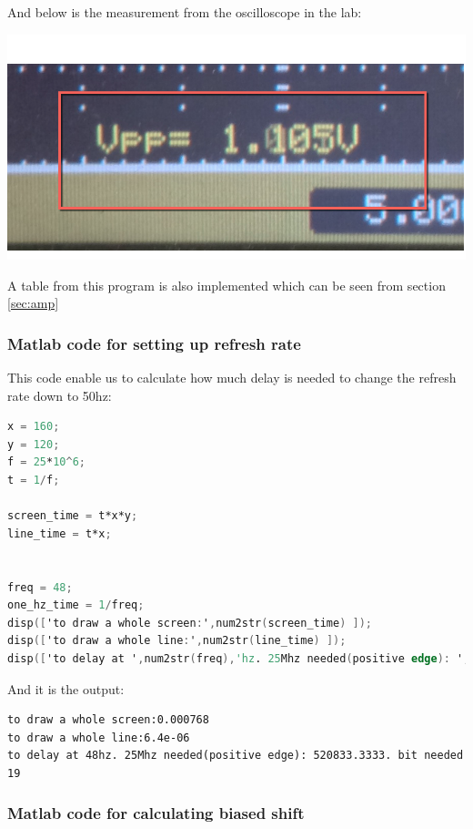 \documentclass[11pt]{scrartcl}
\begin{document}
And below is the measurement from the oscilloscope in the lab:
\begin{center}     
\begin{minipage}[t]{\linewidth}


\includegraphics[scale = 0.4]{vpp.png}
\end{minipage}
\medskip
\end{center}

A table from this program is also implemented which can be seen from section \ref{sec:amp}

\subsubsection{Matlab code for setting up refresh rate}
\label{sec:refresh}
This code enable us to calculate how much delay is needed to change the refresh rate down to 50hz:
\begin{lstlisting}[language=Verilog]
x = 160;
y = 120;
f = 25*10^6;
t = 1/f;

screen_time = t*x*y;
line_time = t*x;


freq = 48;
one_hz_time = 1/freq;
disp(['to draw a whole screen:',num2str(screen_time) ]);
disp(['to draw a whole line:',num2str(line_time) ]);
disp(['to delay at ',num2str(freq),'hz. 25Mhz needed(positive edge): ',num2str(one_hz_time/t),'. bit needed ',num2str(ceil(log2(one_hz_time/t)))]);
\end{lstlisting}

And it is the output:
\begin{verbatim}
to draw a whole screen:0.000768
to draw a whole line:6.4e-06
to delay at 48hz. 25Mhz needed(positive edge): 520833.3333. bit needed 19
\end{verbatim}

\subsubsection{Matlab code for calculating biased shift}
\end{document}

